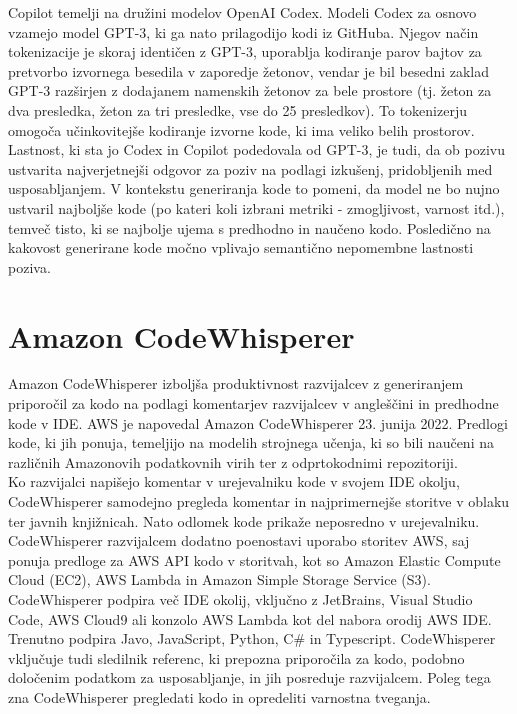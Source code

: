 \documentclass[a4paper,12pt,openright]{book}
\begin{document}
Copilot temelji na družini modelov OpenAI Codex. Modeli Codex za osnovo vzamejo model GPT-3, ki ga nato prilagodijo kodi iz GitHuba. Njegov način tokenizacije je skoraj identičen z GPT-3, uporablja kodiranje parov bajtov za pretvorbo izvornega besedila v zaporedje žetonov, vendar je bil besedni zaklad GPT-3 razširjen z dodajanem namenskih žetonov za bele prostore (tj. žeton za dva presledka, žeton za tri presledke, vse do 25 presledkov). To tokenizerju omogoča učinkovitejše kodiranje izvorne kode, ki ima veliko belih prostorov. Lastnost, ki sta jo Codex in Copilot podedovala od GPT-3, je tudi, da ob pozivu ustvarita najverjetnejši odgovor za poziv na podlagi izkušenj, pridobljenih med usposabljanjem. V kontekstu generiranja kode to pomeni, da model ne bo nujno ustvaril najboljše kode (po kateri koli izbrani metriki - zmogljivost, varnost itd.), temveč tisto, ki se najbolje ujema s predhodno in naučeno kodo. Posledično na kakovost generirane kode močno vplivajo semantično nepomembne lastnosti poziva. \cite{9833571, 10.1145/3520312.3534862}



\section{Amazon CodeWhisperer}
Amazon CodeWhisperer izboljša produktivnost razvijalcev z generiranjem priporočil za kodo na podlagi komentarjev razvijalcev v angleščini in predhodne kode v IDE. AWS je napovedal Amazon CodeWhisperer 23. junija 2022.
Predlogi kode, ki jih ponuja, temeljijo na modelih strojnega učenja, ki so bili naučeni na različnih Amazonovih podatkovnih virih ter z odprtokodnimi repozitoriji.\cite{aws_developer} \\
Ko razvijalci napišejo komentar v urejevalniku kode v svojem IDE okolju, CodeWhisperer samodejno pregleda komentar in najprimernejše storitve v oblaku ter javnih knjižnicah. Nato odlomek kode prikaže neposredno v urejevalniku. CodeWhisperer razvijalcem dodatno poenostavi uporabo storitev AWS, saj ponuja predloge za AWS API kodo v storitvah, kot so Amazon Elastic Compute Cloud (EC2), AWS Lambda in Amazon Simple Storage Service (S3). CodeWhisperer podpira več IDE okolij, vključno z JetBrains, Visual Studio Code, AWS Cloud9 ali konzolo AWS Lambda kot del nabora orodij AWS IDE. Trenutno podpira Javo, JavaScript, Python, C\# in Typescript. CodeWhisperer vključuje tudi sledilnik referenc, ki prepozna priporočila za kodo, podobno določenim podatkom za usposabljanje, in jih posreduje razvijalcem. Poleg tega zna CodeWhisperer pregledati kodo in opredeliti varnostna tveganja. \cite{saasworthy_codewhisperer}
\pagebreak
\end{document}
